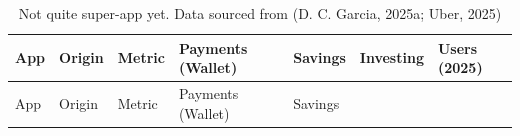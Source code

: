 \documentclass[
  12pt,
  letterpaper,
  DIV=11,
  numbers=noendperiod]{scrartcl}
\begin{document}
\begin{longtable}[]{@{}
  >{\raggedright\arraybackslash}p{}
  >{\raggedright\arraybackslash}p{}
  >{\raggedright\arraybackslash}p{}
  >{\raggedright\arraybackslash}p{}
  >{\raggedright\arraybackslash}p{}
  >{\raggedright\arraybackslash}p{}
  >{\raggedright\arraybackslash}p{}@{}}
\caption[Not Quite Superapps]{Not quite super-app yet. Data sourced from
(D. C. Garcia, 2025a; Uber, 2025)}\tabularnewline
\toprule\noalign{}
\begin{minipage}[b]{\linewidth}\raggedright
App
\end{minipage} & \begin{minipage}[b]{\linewidth}\raggedright
Origin
\end{minipage} & \begin{minipage}[b]{\linewidth}\raggedright
Metric
\end{minipage} & \begin{minipage}[b]{\linewidth}\raggedright
Payments (Wallet)
\end{minipage} & \begin{minipage}[b]{\linewidth}\raggedright
Savings
\end{minipage} & \begin{minipage}[b]{\linewidth}\raggedright
Investing
\end{minipage} & \begin{minipage}[b]{\linewidth}\raggedright
Users (2025)
\end{minipage} \\
\midrule\noalign{}
\endfirsthead
\toprule\noalign{}
\begin{minipage}[b]{\linewidth}\raggedright
App
\end{minipage} & \begin{minipage}[b]{\linewidth}\raggedright
Origin
\end{minipage} & \begin{minipage}[b]{\linewidth}\raggedright
Metric
\end{minipage} & \begin{minipage}[b]{\linewidth}\raggedright
Payments (Wallet)
\end{minipage} & \begin{minipage}[b]{\linewidth}\raggedright
Savings

\end{minipage}
\end{longtable}
\end{document}
